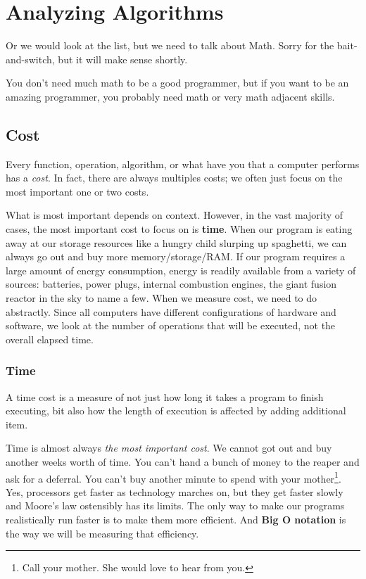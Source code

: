 \chapter{Analyzing Algorithms}
\label{chap:analysis}
Or we would look at the list, but we need to talk about Math.  Sorry for the bait-and-switch, but it will make sense shortly.

You don't need much math to be a good programmer, but if you want to be an amazing programmer, you probably need math or very math adjacent skills.



\section{Cost}
Every function, operation, algorithm, or what have you that a computer performs has a \emph{cost}. 
In fact, there are always multiples costs;  we often just focus on the most important one or two costs.  

What is most important depends on context.
However, in the vast majority of cases, the most important cost to focus on is \textbf{time}.
When our program is eating away at our storage resources like a hungry child slurping up spaghetti, we can always go out and buy more memory/storage/RAM.
If our program requires a large amount of energy consumption, energy is readily available from a variety of sources: batteries, power plugs, internal combustion engines, the giant fusion reactor in the sky to name a few.
When we measure cost, we need to do abstractly.  Since all computers have different configurations of hardware and software, we look at the number of operations that will be executed, not the overall elapsed time.

\subsection{Time}
A time cost is a measure of not just how long it takes a program to finish executing, bit also how the length of execution is affected by adding additional item.

Time is almost always \emph{the most important cost}. We cannot got out and buy another weeks worth of time.  You can't hand a bunch of money to the reaper and ask for a deferral. You can't buy another minute to spend with your mother\footnote{Call your mother.  She would love to hear from you.}.
Yes, processors get faster as technology marches on, but they get faster slowly and Moore's law ostensibly has its limits.
The only way to make our programs realistically run faster is to make them more efficient.  And \textbf{Big O notation} is the way we will be measuring that efficiency.


